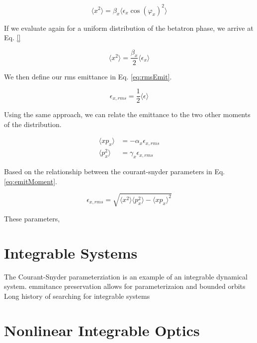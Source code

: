 \begin{equation} \label{eq:momX2}
	\langle x^2 \rangle = \beta_x \langle \epsilon_x \cos{(\varphi_x)}^2 \rangle
\end{equation}

If we evaluate again for a uniform distribution of the betatron phase, we arrive at Eq. \ref{}

\begin{equation} \label{eq:emitDef}
	\langle x^2 \rangle = \frac{\beta_x}{2} \langle \epsilon_x \rangle
\end{equation}

We then define our rms emittance in Eq. \ref{eq:rmsEmit}. 

\begin{equation} \label{eq:rmsEmit}
	\epsilon_{x,rms} = \frac{1}{2} \langle \epsilon \rangle
\end{equation}

Using the same approach, we can relate the emittance to the two other moments of the distribution.

\begin{equation} \label{eq:momP2}
\begin{split}
	\langle x p_x \rangle &= -\alpha_x \epsilon_{x,rms}\\
	\langle p_x^2 \rangle &= \gamma_x \epsilon_{x,rms}
\end{split}
\end{equation}

Based on the relationship between the courant-snyder parameters in Eq. \ref{eq:emitMoment}.

\begin{equation} \label{eq:emitMoment}
	\epsilon_{x,rms} = \sqrt{\langle x^2 \rangle \langle p_x^2 \rangle - \langle x p_x \rangle^2}
\end{equation}

These parameters,

\section{Integrable Systems} \label{sec:integral}
The Courant-Snyder parameterziation is an example of an integrable dynamical system.
emmitance preservation allows for parameterizaion and bounded orbits
Long history of searching for integrable systems

\section{Nonlinear Integrable Optics} \label{sec:nio}


\cite{danilov_nonlinear_2010}
